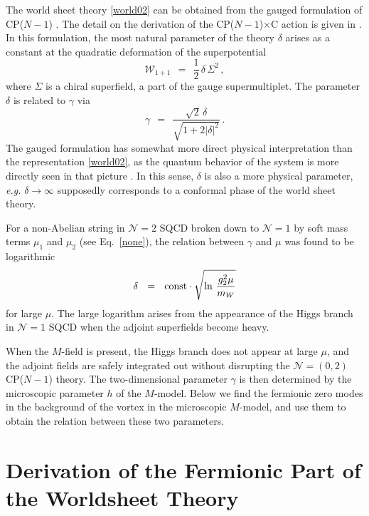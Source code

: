 \documentclass[12pt]{article}
\def\beq{\begin{equation}}
\def\eeq{\end{equation}}
\newcommand{\ntwo}{${\mathcal N}=2$ }
\newcommand{\ntwoo}{${\mathcal N}= \left(0,2\right) $ }
\newcommand{\none}{${\mathcal N}=1$ }
\newcommand{\CPC}{CP($N-1$)$\times$C }
\begin{document}
	The world sheet theory \eqref{world02} can be obtained from the gauged formulation of CP($N-1$) \cite{W93}.
	The detail on the derivation of the \CPC action is given in \cite{SYhet,BSYhet}.
	In this formulation, the most natural parameter of the theory $\delta$ arises as 
	a constant at the quadratic deformation of the superpotential
\[
	\mathcal{W}_{1+1} ~~=~~ \frac{1}{2}\,\delta\,\Sigma^2\,,
\]
	where $\Sigma$ is a chiral superfield, a part of the gauge supermultiplet.
The parameter $ \delta $ is related to $ \gamma $ via
\[
	\gamma ~~=~~ \frac { \sqrt{2}\,\delta } { \sqrt{ 1 +  2 |\delta|^2 } }\,.
\]
	The gauged formulation has somewhat more direct physical interpretation than
	the representation \eqref{world02}, as the quantum behavior of the system is more directly
	seen in that picture \cite{SYhet2}. 
	In this sense, $ \delta $ is also a more physical parameter, {\it e.g.}
	$ \delta \to \infty $ supposedly corresponds to a conformal phase of the world sheet theory.

	For a non-Abelian string in \ntwo SQCD broken down to \none by soft mass terms $ \mu_1 $ and $ \mu_2 $
	(see Eq.~\eqref{none}), the relation between $ \gamma $ and $ \mu $ was found to be logarithmic \cite{SYhet,BSYhet}
\beq
	\delta ~~=~~ 
	{\rm const} \cdot \sqrt{\ln\, \frac{g_2^2\mu}{m_W}}
\eeq
	for large $ \mu $.
	The large logarithm arises from the appearance of the Higgs branch in \none SQCD when the adjoint superfields
	become heavy.

	When the $ M $-field is present, the Higgs branch does not appear at large $ \mu $, and the adjoint
	fields are safely integrated out without disrupting the \ntwoo CP($N-1$) theory.
	The two-dimensional parameter $ \gamma $ is then determined by the microscopic parameter $ h $ of the 
	$ M $-model. 
	Below we find the fermionic zero modes in the background of the vortex in the microscopic $M$-model,
	and use them to obtain the relation between these two parameters. 
	
%
%
\section{Derivation of the Fermionic Part of the Worldsheet Theory}
\setcounter{equation}{0}
\end{document}

